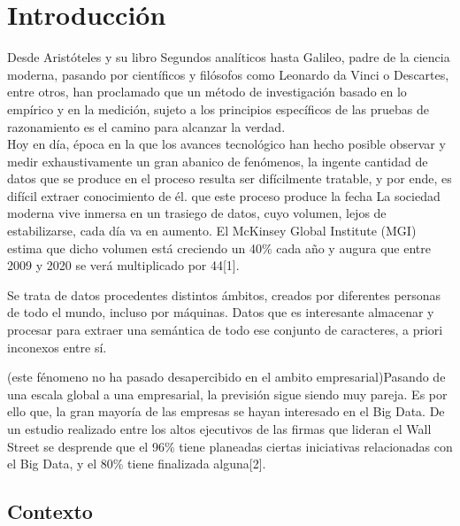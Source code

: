 
\pagestyle{fancy}

\chapter{Introducción}
\label{introduccion}

Desde Aristóteles y su libro Segundos analíticos hasta Galileo, padre de la ciencia moderna, pasando por científicos y filósofos como Leonardo da Vinci o Descartes, entre otros, han proclamado que un método de investigación basado en lo empírico y en la medición, sujeto a los principios específicos de las pruebas de razonamiento es el camino para alcanzar la verdad.\\

Hoy en día, época en la que los avances tecnológico han hecho posible observar y medir exhaustivamente un gran abanico de fenómenos, la ingente cantidad de datos que se produce en el proceso resulta ser difícilmente tratable, y por ende, es difícil extraer conocimiento de él. que este proceso produce la fecha La sociedad moderna vive inmersa en un trasiego de datos, cuyo volumen, lejos de estabilizarse, cada día va en aumento. El McKinsey Global Institute (MGI) estima que dicho volumen está creciendo un 40\% cada año y augura que entre 2009 y 2020 se verá multiplicado por 44[1].

Se trata de datos procedentes distintos ámbitos, creados por diferentes personas de todo el mundo, incluso por máquinas. Datos que es interesante almacenar y procesar para extraer una semántica de todo ese conjunto de caracteres, a priori inconexos entre sí. 

(este fénomeno no ha pasado desapercibido en el ambito empresarial)Pasando de una escala global a una empresarial, la previsión sigue siendo muy pareja. Es por ello que, la gran mayoría de las empresas se hayan interesado en el Big Data. De un estudio realizado entre los altos ejecutivos de las firmas que lideran el Wall Street se desprende que el 96\% tiene planeadas ciertas iniciativas relacionadas con el Big Data, y el 80\% tiene finalizada alguna[2].

\section{Contexto}

